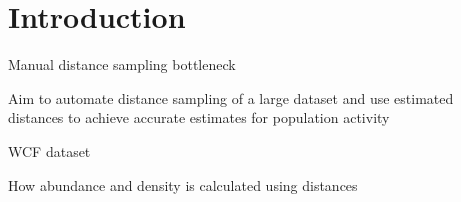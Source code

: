 \section{Introduction}

Manual distance sampling bottleneck

Aim to automate distance sampling of a large dataset and use estimated distances to achieve
accurate estimates for population activity

WCF dataset

How abundance and density is calculated using distances